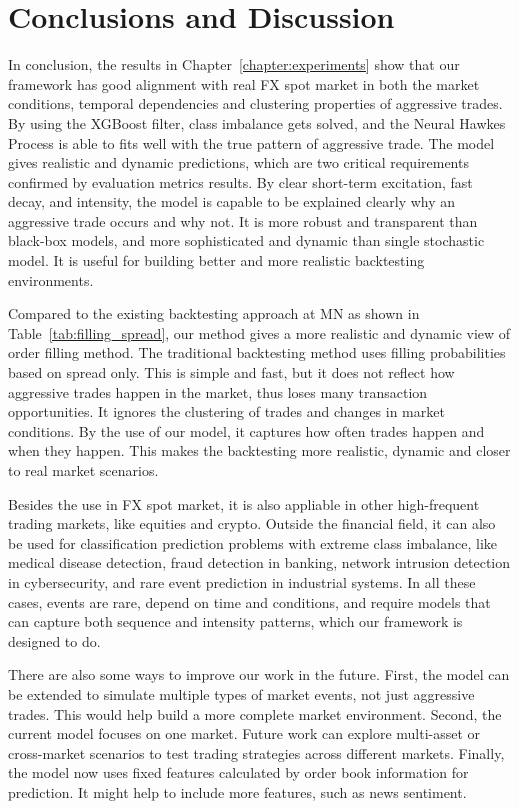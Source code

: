 \chapter{Conclusions and Discussion}\label{chapter:cd}
In conclusion, the results in Chapter~\ref{chapter:experiments} show that our framework has good alignment with real FX spot market in both the market conditions, temporal dependencies and clustering properties of aggressive trades. By using the XGBoost filter, class imbalance gets solved, and the Neural Hawkes Process is able to fits well with the true pattern of aggressive trade. The model gives realistic and dynamic predictions, which are two critical requirements confirmed by evaluation metrics results. By clear short-term excitation, fast decay, and intensity, the model is capable to be explained clearly why an aggressive trade occurs and why not. It is more robust and transparent than black-box models, and more sophisticated and dynamic than single stochastic model. It is useful for building better and more realistic backtesting environments.

Compared to the existing backtesting approach at MN as shown in Table~\ref{tab:filling_spread}, our method gives a more realistic and dynamic view of order filling method. The traditional backtesting method uses filling probabilities based on spread only. This is simple and fast, but it does not reflect how aggressive trades happen in the market, thus loses many transaction opportunities. It ignores the clustering of trades and changes in market conditions. By the use of our model, it captures how often trades happen and when they happen. This makes the backtesting more realistic, dynamic and closer to real market scenarios. 

Besides the use in FX spot market, it is also appliable in other high-frequent trading markets, like equities and crypto. Outside the financial field, it can also be used for classification prediction problems with extreme class imbalance, like medical disease detection, fraud detection in banking, network intrusion detection in cybersecurity, and rare event prediction in industrial systems. In all these cases, events are rare, depend on time and conditions, and require models that can capture both sequence and intensity patterns, which our framework is designed to do.

There are also some ways to improve our work in the future. First, the model can be extended to simulate multiple types of market events, not just aggressive trades. This would help build a more complete market environment. Second, the current model focuses on one market. Future work can explore multi-asset or cross-market scenarios to test trading strategies across different markets. Finally, the model now uses fixed features calculated by order book information for prediction. It might help to include more features, such as news sentiment. 